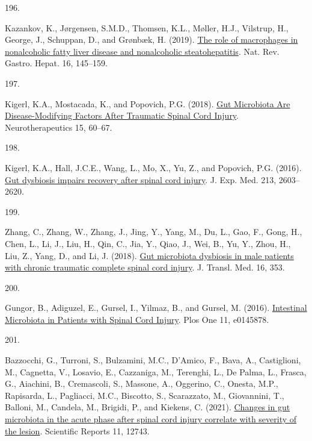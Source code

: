 \documentclass[
]{article}
\newlength{\cslhangindent}
\newlength{\csllabelwidth}
\newlength{\cslentryspacingunit} %
\newenvironment{CSLReferences}[2] %
 {%
  \setlength{\parindent}{0pt}
  \ifodd #1
  \let\oldpar\par
  \def\par{\hangindent=\cslhangindent\oldpar}
  \fi
  \setlength{\parskip}{#2\cslentryspacingunit}
 }%
 {}
\newcommand{\CSLLeftMargin}[1]{\parbox[t]{\csllabelwidth}{#1}}
\newcommand{\CSLRightInline}[1]{\parbox[t]{\linewidth - \csllabelwidth}{#1}\break}
\begin{document}
\begin{CSLReferences}{0}{0}
\leavevmode{}%
\CSLLeftMargin{196. }
\CSLRightInline{Kazankov, K., Jørgensen, S.M.D., Thomsen, K.L., Møller, H.J., Vilstrup, H., George, J., Schuppan, D., and Grønbæk, H. (2019). \href{https://doi.org/10.1038/s41575-018-0082-x}{The role of macrophages in nonalcoholic fatty liver disease and nonalcoholic steatohepatitis}. Nat. Rev. Gastro. Hepat. 16, 145--159.}

\leavevmode{}%
\CSLLeftMargin{197. }
\CSLRightInline{Kigerl, K.A., Mostacada, K., and Popovich, P.G. (2018). \href{https://doi.org/10.1007/s13311-017-0583-2}{Gut {Microbiota Are Disease-Modifying Factors After Traumatic Spinal Cord Injury}}. Neurotherapeutics 15, 60--67.}

\leavevmode{}%
\CSLLeftMargin{198. }
\CSLRightInline{Kigerl, K.A., Hall, J.C.E., Wang, L., Mo, X., Yu, Z., and Popovich, P.G. (2016). \href{https://doi.org/10.1084/jem.20151345}{Gut dysbiosis impairs recovery after spinal cord injury}. J. Exp. Med. 213, 2603--2620.}

\leavevmode{}%
\CSLLeftMargin{199. }
\CSLRightInline{Zhang, C., Zhang, W., Zhang, J., Jing, Y., Yang, M., Du, L., Gao, F., Gong, H., Chen, L., Li, J., Liu, H., Qin, C., Jia, Y., Qiao, J., Wei, B., Yu, Y., Zhou, H., Liu, Z., Yang, D., and Li, J. (2018). \href{https://doi.org/10.1186/s12967-018-1735-9}{Gut microbiota dysbiosis in male patients with chronic traumatic complete spinal cord injury}. J. Transl. Med. 16, 353.}

\leavevmode{}%
\CSLLeftMargin{200. }
\CSLRightInline{Gungor, B., Adiguzel, E., Gursel, I., Yilmaz, B., and Gursel, M. (2016). \href{https://doi.org/10.1371/journal.pone.0145878}{Intestinal {Microbiota} in {Patients} with {Spinal Cord Injury}}. Plos One 11, e0145878.}

\leavevmode{}%
\CSLLeftMargin{201. }
\CSLRightInline{Bazzocchi, G., Turroni, S., Bulzamini, M.C., D'Amico, F., Bava, A., Castiglioni, M., Cagnetta, V., Losavio, E., Cazzaniga, M., Terenghi, L., De Palma, L., Frasca, G., Aiachini, B., Cremascoli, S., Massone, A., Oggerino, C., Onesta, M.P., Rapisarda, L., Pagliacci, M.C., Biscotto, S., Scarazzato, M., Giovannini, T., Balloni, M., Candela, M., Brigidi, P., and Kiekens, C. (2021). \href{https://doi.org/10.1038/s41598-021-92027-z}{Changes in gut microbiota in the acute phase after spinal cord injury correlate with severity of the lesion}. Scientific Reports 11, 12743.}


\end{CSLReferences}
\end{document}
